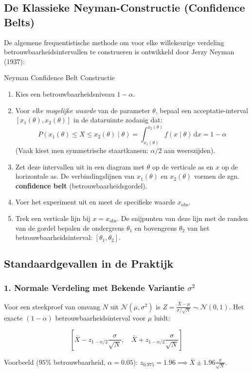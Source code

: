 \documentclass[11pt,a4paper]{article}
\newcommand{\dd}{\mathrm{d}}
\newcommand{\normdist}{\mathcal{N}}
\begin{document}
\subsection{De Klassieke Neyman-Constructie (Confidence Belts)}
De algemene frequentistische methode om voor elke willekeurige verdeling betrouwbaarheidsintervallen te construeren is ontwikkeld door Jerzy Neyman (1937):
\begin{stappenplan}{Neyman Confidence Belt Constructie}
\begin{enumerate}[leftmargin=1.2em]
    \item Kies een betrouwbaarheidsniveau $1 - \alpha$.
    \item Voor \emph{elke mogelijke waarde} van de parameter $\theta$, bepaal een acceptatie-interval $[x_1(\theta), x_2(\theta)]$ in de dataruimte zodanig dat:
    \begin{equation}
        P(x_1(\theta) \le X \le x_2(\theta) \mid \theta) = \int_{x_1(\theta)}^{x_2(\theta)} f(x \mid \theta) \, \dd x = 1 - \alpha
    \end{equation}
    (Vaak kiest men symmetrische staartkansen: $\alpha/2$ aan weerszijden).
    \item Zet deze intervallen uit in een diagram met $\theta$ op de verticale as en $x$ op de horizontale as. De verbindingslijnen van $x_1(\theta)$ en $x_2(\theta)$ vormen de zgn. \textbf{confidence belt} (betrouwbaarheidsgordel).
    \item Voer het experiment uit en meet de specifieke waarde $x_{\text{obs}}$.
    \item Trek een verticale lijn bij $x = x_{\text{obs}}$. De snijpunten van deze lijn met de randen van de gordel bepalen de ondergrens $\theta_1$ en bovengrens $\theta_2$ van het betrouwbaarheidsinterval: $[\theta_1, \theta_2]$.
\end{enumerate}
\end{stappenplan}

\subsection{Standaardgevallen in de Praktijk}
\subsubsection{1. Normale Verdeling met Bekende Variantie \texorpdfstring{$\sigma^2$}{sigma-kwadraat}}
Voor een steekproef van omvang $N$ uit $\normdist(\mu, \sigma^2)$ is $Z = \frac{\bar{X} - \mu}{\sigma / \sqrt{N}} \sim \normdist(0, 1)$.
Het exacte $(1 - \alpha)$ betrouwbaarheidsinterval voor $\mu$ luidt:
\begin{formulabox}
\begin{equation}
    \left[ \bar{X} - z_{1 - \alpha/2} \frac{\sigma}{\sqrt{N}}, \quad \bar{X} + z_{1 - \alpha/2} \frac{\sigma}{\sqrt{N}} \right]
\end{equation}
\end{formulabox}
Voorbeeld ($95\%$ betrouwbaarheid, $\alpha = 0.05$): $z_{0.975} = 1.96 \implies \bar{X} \pm 1.96 \frac{\sigma}{\sqrt{N}}$.
\end{document}
